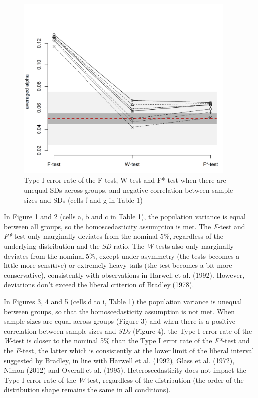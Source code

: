 \documentclass[man,floatsintext]{apa6}
\begin{document}
\begin{figure}
\includegraphics[width=400px]{Rmarkdown folder/Rmarkdown inputs/Fig1E} \caption{Type I error rate of the F-test, W-test and F*-test when there are unequal SDs across groups, and negative correlation between sample sizes and SDs (cells f and g in Table 1)}\label{fig:unnamed-chunk-5}
\end{figure}

In Figure 1 and 2 (cells a, b and c in Table 1), the population variance is equal between all groups, so the homoscedasticity assumption is met. The \emph{F}-test and \emph{F*}-test only marginally deviates from the nominal 5\%, regardless of the underlying distribution and the \emph{SD}-ratio. The \emph{W}-tests also only marginally deviates from the nominal 5\%, except under asymmetry (the tests becomes a little more sensitive) or extremely heavy tails (the test becomes a bit more conservative), consistently with observations in Harwell et al. (1992). However, deviations don't exceed the liberal criterion of Bradley (1978).

In Figures 3, 4 and 5 (cells d to i, Table 1) the population variance is unequal between groups, so that the homoscedasticity assumption is not met. When sample sizes are equal across groups (Figure 3) and when there is a positive correlation between sample sizes and \emph{SDs} (Figure 4), the Type I error rate of the \emph{W}-test is closer to the nominal 5\% than the Type I error rate of the \emph{F*}-test and the \emph{F}-test, the latter which is consistently at the lower limit of the liberal interval suggested by Bradley, in line with Harwell et al. (1992), Glass et al. (1972), Nimon (2012) and Overall et al. (1995). Heteroscedasticity does not impact the Type I error rate of the \emph{W}-test, regardless of the distribution (the order of the distribution shape remains the same in all conditions).
\end{document}

